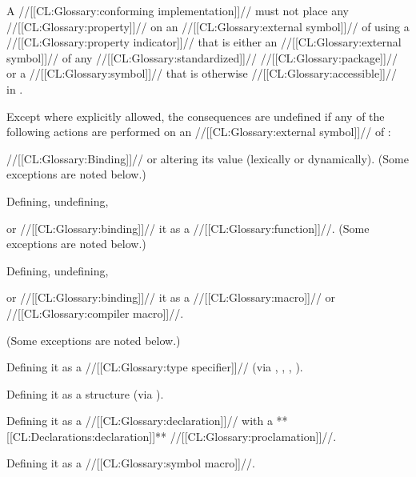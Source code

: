 A //[[CL:Glossary:conforming implementation]]// must not place any //[[CL:Glossary:property]]// on
an //[[CL:Glossary:external symbol]]// of  using a //[[CL:Glossary:property indicator]]//
that is either an //[[CL:Glossary:external symbol]]// of any //[[CL:Glossary:standardized]]// //[[CL:Glossary:package]]//
or a //[[CL:Glossary:symbol]]// that is otherwise //[[CL:Glossary:accessible]]// in .
 






\endsubsubsubsection%
 
Except where explicitly allowed, the consequences are undefined if any
of the following actions are performed on an //[[CL:Glossary:external symbol]]// 
of :

\beginlist

 //[[CL:Glossary:Binding]]// or altering its value (lexically or dynamically).
	      (Some exceptions are noted below.)

 Defining, 
	      undefining, 

	  or //[[CL:Glossary:binding]]// it as a //[[CL:Glossary:function]]//.
	      (Some exceptions are noted below.)

 Defining,
	      undefining, 

	   or //[[CL:Glossary:binding]]// it as a //[[CL:Glossary:macro]]//
	      or //[[CL:Glossary:compiler macro]]//.

	      (Some exceptions are noted below.)


 Defining it as a //[[CL:Glossary:type specifier]]// 
	      (via , 
		   ,
		   ,
		   ).

 Defining it as a structure (via ).

 Defining it as a //[[CL:Glossary:declaration]]// 
	      with a **[[CL:Declarations:declaration]]** //[[CL:Glossary:proclamation]]//.

 Defining it as a //[[CL:Glossary:symbol macro]]//.





